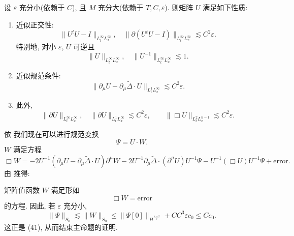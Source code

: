 \begin{proposition}\label{prop:2.28}
设 $\varepsilon$ 充分小(依赖于 $C$), 且 $M$ 充分大(依赖于 $T, C, \varepsilon$). 则矩阵 $U$ 满足如下性质:
\begin{enumerate}[label=\roman*.)]
\item 近似正交性:
\[
\|U^{t}U-I\|_{L_{t}^{\infty}L_{x}^{\infty}},\quad\|\partial(U^{t}U-I)\|_{L_{t}^{\infty}L_{x}^{\infty}}\lesssim C^{2}\varepsilon.
\]
特别地, 对小 $\varepsilon$, $U$ 可逆且
\[
\|U\|_{L_{t}^{\infty}L_{x}^{\infty}},\quad\|U^{-1}\|_{L_{t}^{\infty}L_{x}^{\infty}}\lesssim1.
\]
\item 近似规范条件:
\[
\|\partial_{\mu}U-\partial_{\mu}\tilde{\Delta}\cdot U\|_{L_{t}^{1}L_{x}^{\infty}}\lesssim C^{2}\varepsilon.
\]
\item 此外,
\[
\|\partial U\|_{L_{t}^{\infty}L_{x}^{\infty}},\quad\|\partial U\|_{L_{t}^{1}L_{x}^{\infty}}\lesssim C^{2}\varepsilon,\qquad
\|\Box U\|_{L_{t}^{2}L_{x}^{n-1}}\lesssim C^{2}\varepsilon.
\]
\end{enumerate}
\end{proposition}

依 \cite{klai70} 我们现在可以进行规范变换
\[
\Psi=U\cdot W.
\]
$W$ 满足方程
\[
\Box W=-2U^{-1}(\partial_{\mu}U-\partial_{\mu}\tilde{\Delta}\cdot U)\partial^{\mu}W
-2U^{-1}\partial_{\mu}\tilde{\Delta}\cdot(\partial^{\mu}U)U^{-1}\Psi-U^{-1}(\Box U)U^{-1}\Psi+\text{error}.
\]
由 推得:
\begin{proposition}\label{prop:2.29}
矩阵值函数 $W$ 满足形如
\[
\Box W=\text{error}
\]
的方程. 因此, 若 $\varepsilon$ 充分小,
\[
\|\Psi\|_{S_{0}}\lesssim\|W\|_{S_{0}}\leq\|\Psi[0]\|_{H^{\frac{n-2}{2}}}+C C^{3}\varepsilon c_{0}\leq C c_{0}.
\]
这正是 (41), 从而结束主命题的证明.\end{proposition}
